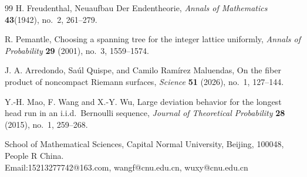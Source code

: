 \documentclass[10pt,twoside]{article}
\begin{document}
\begin{thebibliography}{99}
H. Freudenthal,
\newblock Neuaufbau Der Endentheorie,
\newblock \emph{Annals of Mathematics} \textbf{43}(1942), no.~2, 261--279.

R. Pemantle,
\newblock Choosing a spanning tree for the integer lattice uniformly,
\newblock \emph{Annals of Probability} \textbf{29} (2001), no.~3, 1559--1574.

J. A. Arredondo, Sa\'ul Quispe, and Camilo Ram\'irez Maluendas,
\newblock On the fiber product of noncompact Riemann surfaces,
\newblock \emph{Science} \textbf{51} (2026), no.~1, 127--144.

Y.-H. Mao, F. Wang and X.-Y. Wu,
\newblock Large deviation behavior for the longest head run in an i.i.d.\ Bernoulli sequence,
\newblock \emph{Journal of Theoretical Probability} \textbf{28} (2015), no.~1, 259--268.

\end{thebibliography}

\noindent School of Mathematical Sciences, Capital Normal University, Beijing, 100048, People R China.\\
\indent Email:15213277742@163.com, wangf@cnu.edu.cn, wuxy@cnu.edu.cn
\end{document}
